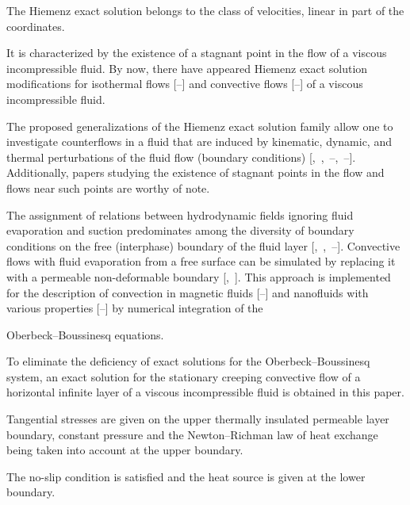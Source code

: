 The Hiemenz exact solution \cite{ulg:bib:Hiemenz} belongs to the class of velocities, linear in part of the coordinates. 

It is characterized by the existence of a stagnant point in the flow of a viscous incompressible fluid. By now, there have appeared Hiemenz exact solution modifications for isothermal flows [--] and convective flows [--] of a viscous incompressible fluid. 

The proposed generalizations of the Hiemenz exact solution family allow one to investigate counterflows in a fluid that are induced by kinematic, dynamic, and thermal perturbations of the fluid flow (boundary conditions) [,~,~--,~--]. Additionally, papers studying the existence of stagnant points in the flow and flows near such points are worthy of note.



The assignment of relations between hydrodynamic fields ignoring fluid evapo\-ration and suction predominates among the diversity of boundary conditions on the free (interphase) boundary of the fluid layer [,~,~--]. Convective flows with fluid evaporation from a free surface can be simulated by replacing it with a permeable non-deformable boundary [,~]. This approach is implemented for the description of convection in magnetic fluids [--] and nanofluids with various properties [--] by numerical integration of the 

Oberbeck--Boussinesq equations.



To eliminate the deficiency of exact solutions for the Oberbeck--Boussinesq system, an exact solution for the stationary creeping convective flow of a horizontal infinite layer of a viscous incompressible fluid is obtained in this paper. 

Tangential stresses are given on the upper thermally insulated permeable layer boundary, constant pressure and the Newton--Richman law of heat exchange being taken into account at the upper boundary. 

The no-slip condition is satisfied and the heat source is given at the lower boundary. 

